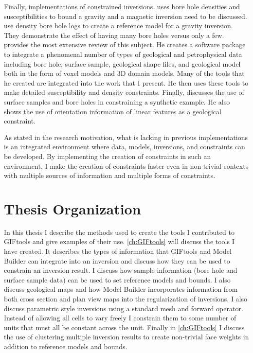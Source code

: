 Finally, implementations of constrained inversions. \cite{phillips2001thesis} uses bore hole densities and susceptibilities to bound a gravity and a magnetic inversion need to be discussed. \cite{farquharson2008geologically} use density bore hole logs to create a reference model for a gravity inversion. They demonstrate the effect of having many bore holes versus only a few. \cite{williams2008geologically}  provides the most extensive review of this subject. He creates a software package to integrate a phenomenal number of types of geological and petrophysical data including bore hole, surface sample, geological shape files, and geological model both in the form of voxel models and 3D domain models. Many of the tools that he created are integrated into the work that I present. He then uses these tools to make detailed susceptibility and density constraints. Finally, \cite{Lelievre2009Integrating} discusses the use of surface samples and bore holes in constraining a synthetic example. He also shows the use of orientation information of linear features as a geological constraint. 

As stated in the research motivation, what is lacking in previous implementations is an integrated environment where data, models, inversions, and constraints can be developed. By implementing the creation of constraints in such an environment, I make the creation of constraints faster even in non-trivial contexts with multiple sources of information and multiple forms of constraints.

\section{Thesis Organization}
\label{sec:Thesis Organization}
		
In this thesis I describe the methods used to create the tools I contributed to GIFtools and give examples of their use. \autoref{ch:GIFtools} will discuss the tools I have created. It  describes the types of information that GIFtools and Model Builder can integrate into an inversion and discuss how they can be used to constrain an inversion result. I discuss how sample information (bore hole and surface sample data) can be used to set reference models and bounds. I also discuss geological maps and how Model Builder incorporates information from both cross section and plan view maps into the regularization of inversions. I also discuss parametric style inversions using a standard mesh and forward operator. Instead of allowing all cells to vary freely I constrain them to some number of units that must all be constant across the unit. Finally in \autoref{ch:GIFtools}  I discuss the use of clustering multiple inversion results to create non-trivial face weights in addition to reference models and bounds.

